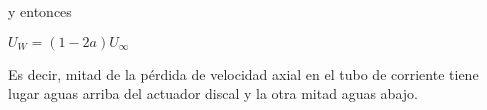 y entonces

$U_{W} = (1-2a)U_{\infty}$

Es decir, mitad de la pérdida de velocidad axial en el tubo de corriente tiene lugar aguas arriba del actuador discal y la otra mitad aguas abajo.


%
%
%
%
%
%
%
%
%
%
%
%
%
%
%
%
%
%
%
%
%
